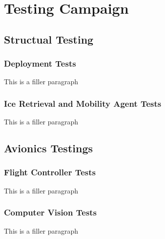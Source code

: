 \chapter{Testing Campaign}

\section{Structual Testing}
	\subsection{Deployment Tests}
		This is a filler paragraph

	\subsection{Ice Retrieval and Mobility Agent Tests}
		This is a filler paragraph

\section{Avionics Testings}
	\subsection{Flight Controller Tests}
		This is a filler paragraph

	\subsection{Computer Vision Tests}
		This is a filler paragraph





